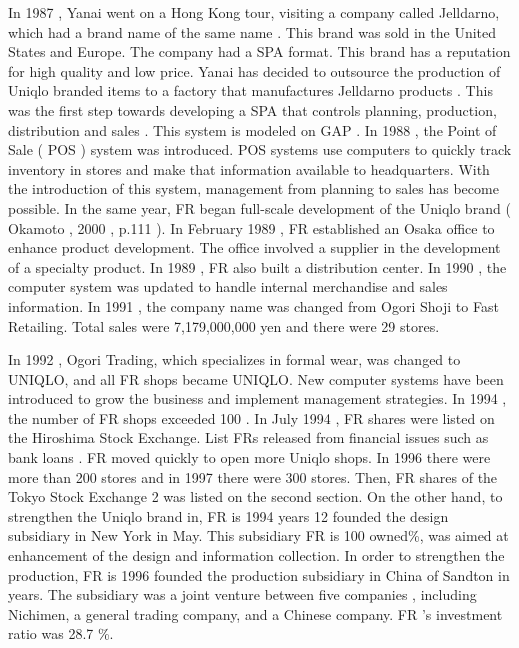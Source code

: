 \documentclass[]{article}
\begin{document}
In 1987 , Yanai went on a Hong Kong tour, visiting a company called
Jelldarno, which had a brand name of the same name . This brand was sold
in the United States and Europe. The company had a SPA format. This
brand has a reputation for high quality and low price. Yanai has decided
to outsource the production of Uniqlo branded items to a factory that
manufactures Jelldarno products . This was the first step towards
developing a SPA that controls planning, production, distribution and
sales . This system is modeled on GAP . In 1988 , the Point of Sale (
POS ) system was introduced. POS systems use computers to quickly track
inventory in stores and make that information available to headquarters.
With the introduction of this system, management from planning to sales
has become possible. In the same year, FR began full-scale development
of the Uniqlo brand ( Okamoto , 2000 , p.111 ). In February 1989 , FR
established an Osaka office to enhance product development. The office
involved a supplier in the development of a specialty product. In 1989 ,
FR also built a distribution center. In 1990 , the computer system was
updated to handle internal merchandise and sales information. In 1991 ,
the company name was changed from Ogori Shoji to Fast Retailing. Total
sales were 7,179,000,000 yen and there were 29 stores.

In 1992 , Ogori Trading, which specializes in formal wear, was changed
to UNIQLO, and all FR shops became UNIQLO. New computer systems have
been introduced to grow the business and implement management
strategies. In 1994 , the number of FR shops exceeded 100 . In July 1994
, FR shares were listed on the Hiroshima Stock Exchange. List FRs
released from financial issues such as bank loans . FR moved quickly to
open more Uniqlo shops. In 1996 there were more than 200 stores and in
1997 there were 300 stores. Then, FR shares of the Tokyo Stock Exchange
2 was listed on the second section. On the other hand, to strengthen the
Uniqlo brand in, FR is 1994 years 12 founded the design subsidiary in
New York in May. This subsidiary FR is 100 owned\%, was aimed at
enhancement of the design and information collection. In order to
strengthen the production, FR is 1996 founded the production subsidiary
in China of Sandton in years. The subsidiary was a joint venture between
five companies , including Nichimen, a general trading company, and a
Chinese company. FR 's investment ratio was 28.7 \%.
\end{document}
